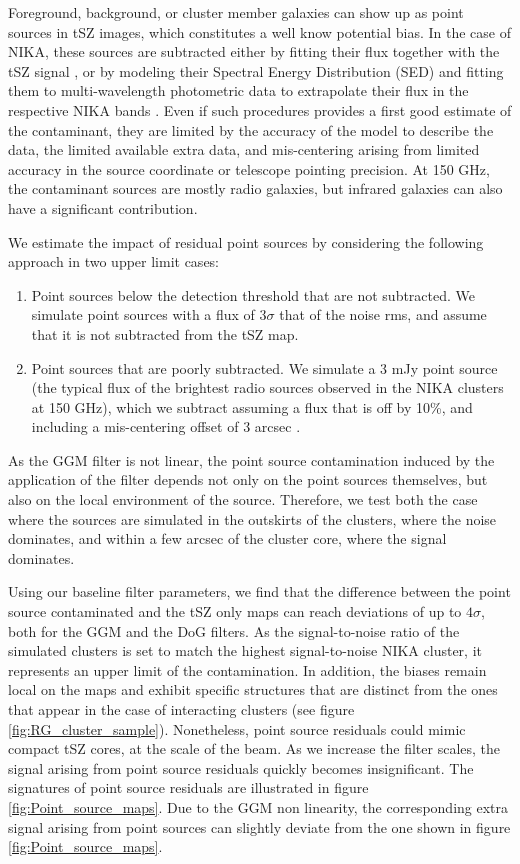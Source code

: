 \documentclass[twocolumn,traditabstract]{aa}
\begin{document}
Foreground, background, or cluster member galaxies can show up as point sources in tSZ images, which constitutes a well know potential bias. In the case of NIKA, these sources are subtracted either by fitting their flux together with the tSZ signal \citep{Adam2015}, or by modeling their Spectral Energy Distribution (SED) and fitting them to multi-wavelength photometric data to extrapolate their flux in the respective NIKA bands \citep[see the method detailed in][]{Adam2016a}. Even if such procedures provides a first good estimate of the contaminant, they are limited by the accuracy of the model to describe the data, the limited available extra data, and mis-centering arising from limited accuracy in the source coordinate or telescope pointing precision. At 150 GHz, the contaminant sources are mostly radio galaxies, but infrared galaxies can also have a significant contribution.

We estimate the impact of residual point sources by considering the following approach in two upper limit cases:
\begin{enumerate} 
\item Point sources below the detection threshold that are not subtracted. We simulate point sources with a flux of $3 \sigma$ that of the noise rms, and assume that it is not subtracted from the tSZ map. 
\item Point sources that are poorly subtracted. We simulate a 3 mJy point source (the typical flux of the brightest radio sources observed in the NIKA clusters at 150 GHz), which we subtract assuming a flux that is off by 10\%, and including a mis-centering offset of 3 arcsec \citep[the NIKA pointing accuracy for one scan][]{Catalano2014}.
\end{enumerate}
As the GGM filter is not linear, the point source contamination induced by the application of the filter depends not only on the point sources themselves, but also on the local environment of the source. Therefore, we test both the case where the sources are simulated in the outskirts of the clusters, where the noise dominates, and within a few arcsec of the cluster core, where the signal dominates.

Using our baseline filter parameters, we find that the difference between the point source contaminated and the tSZ only maps can reach deviations of up to $4 \sigma$, both for the GGM and the DoG filters. As the signal-to-noise ratio of the simulated clusters is set to match the highest signal-to-noise NIKA cluster, it represents an upper limit of the contamination. In addition, the biases remain local on the maps and exhibit specific structures that are distinct from the ones that appear in the case of interacting clusters (see figure \ref{fig:RG_cluster_sample}). Nonetheless, point source residuals could mimic compact tSZ cores, at the scale of the beam. As we increase the filter scales, the signal arising from point source residuals quickly becomes insignificant. The signatures of point source residuals are illustrated in figure \ref{fig:Point_source_maps}. Due to the GGM non linearity, the corresponding extra signal arising from point sources can slightly deviate from the one shown in figure \ref{fig:Point_source_maps}.
\end{document}
